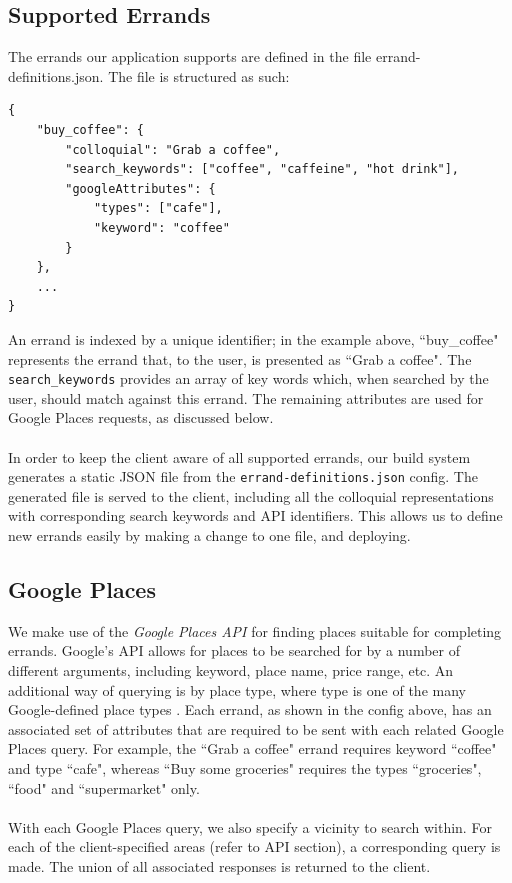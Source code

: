 \documentclass[a4paper, 10pt]{report}
\begin{document}
\subsection{Supported Errands}
The errands our application supports are defined in the file errand-definitions.json. The file is structured as such:
\begin{verbatim}
{
    "buy_coffee": {
        "colloquial": "Grab a coffee",
        "search_keywords": ["coffee", "caffeine", "hot drink"],
        "googleAttributes": {
            "types": ["cafe"],
            "keyword": "coffee"
        }
    },
    ...
}
\end{verbatim}
An errand is indexed by a unique identifier; in the example above, ``buy\_coffee" represents the errand that, to the user, is presented as ``Grab a coffee". The \texttt{search\_keywords} provides an array of key words which, when searched by the user, should match against this errand. The remaining attributes are used for Google Places requests, as discussed below.
\\\\
In order to keep the client aware of all supported errands, our build system generates a static JSON file from the \texttt{errand-definitions.json} config. The generated file is served to the client, including all the colloquial representations with corresponding search keywords and API identifiers. This allows us to define new errands easily by making a change to one file, and deploying.

\subsection{Google Places}
We make use of the \textit{Google Places API} \cite{google-places} for finding places suitable for completing errands. Google's API allows for places to be searched for by a number of different arguments, including keyword, place name, price range, etc. An additional way of querying is by place type, where type is one of the many Google-defined place types \cite{google-places-types}. Each errand, as shown in the config above, has an associated set of attributes that are required to be sent with each related Google Places query. For example, the ``Grab a coffee" errand requires keyword ``coffee" and type ``cafe", whereas ``Buy some groceries" requires the types ``groceries", ``food" and ``supermarket" only.
\\\\
With each Google Places query, we also specify a vicinity to search within. For each of the client-specified areas (refer to API section), a corresponding query is made. The union of all associated responses is returned to the client.
\end{document}
